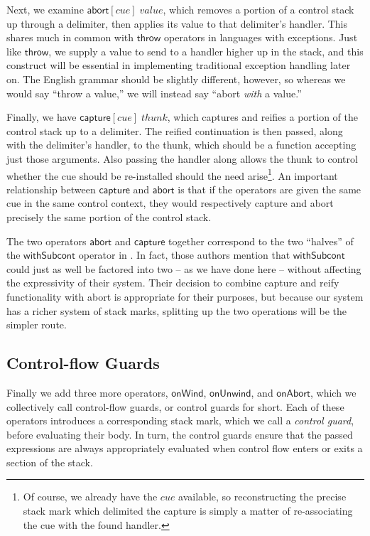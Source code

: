 \documentclass[11pt]{article}
\newcommand{\abort}[2]{\textsf{abort}[#1]\;#2}
\newcommand{\capture}[2]{\textsf{capture}[#1]\;#2}
\begin{document}
Next, we examine $\abort{cue}{value}$, which removes a portion of a control stack up through a delimiter, then applies its value to that delimiter's handler.
This shares much in common with $\textsf{throw}$ operators in languages with exceptions.
Just like $\textsf{throw}$, we supply a value to send to a handler higher up in the stack, and this construct will be essential in implementing traditional exception handling later on.
The English grammar should be slightly different, however, so whereas we would say ``throw a value,'' we will instead say ``abort \emph{with} a value.''

Finally, we have $\capture{cue}{thunk}$, which captures and reifies a portion of the control stack up to a delimiter.
The reified continuation is then passed, along with the delimiter's handler, to the thunk, which should be a function accepting just those arguments.
Also passing the handler along allows the thunk to control whether the cue should be re-installed should the need arise\footnote{Of course, we already have the $cue$ available, so reconstructing the precise stack mark which delimited the capture is simply a matter of re-associating the cue with the found handler.}.
An important relationship between $\textsf{capture}$ and $\textsf{abort}$ is that if the operators are given the same cue in the same control context, they would respectively capture and abort precisely the same portion of the control stack.

The two operators $\textsf{abort}$ and $\textsf{capture}$ together correspond to the two ``halves'' of the $\textsf{withSubcont}$ operator in \cite{MFDC}.
In fact, those authors mention that $\textsf{withSubcont}$ could just as well be factored into two -- as we have done here -- without affecting the expressivity of their system.
Their decision to combine capture and reify functionality with abort is appropriate for their purposes, but because our system has a richer system of stack marks, splitting up the two operations will be the simpler route.

\subsection{Control-flow Guards}

Finally we add three more operators, $\textsf{onWind}$, $\textsf{onUnwind}$, and $\textsf{onAbort}$, which we collectively call control-flow guards, or control guards for short.
Each of these operators introduces a corresponding stack mark, which we call a \emph{control guard}, before evaluating their body.
In turn, the control guards ensure that the passed expressions are always appropriately evaluated when control flow enters or exits a section of the stack.
\end{document}
